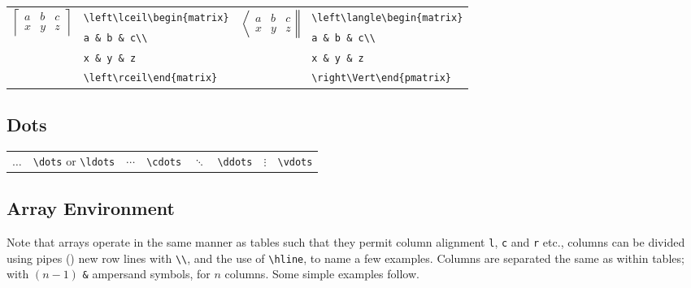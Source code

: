 \documentclass[10pt, english]{article}
\begin{document}
	\begin{center}
		\scriptsize
	\begin{tabular}{ll|ll}
		\multirow{4}{*}{$\left\lceil\begin{matrix}a&b&c\\x&y&z\end{matrix}\right\rceil$} & \verb|\left\lceil\begin{matrix}| & \multirow{4}{*}{$\left\langle\begin{matrix}a&b&c\\x&y&z\end{matrix}\right\Vert$} & \verb|\left\langle\begin{matrix}|\\
		& \verb|a & b & c\\| & & \verb|a & b & c\\|\\ 
		& \verb|x & y & z| & & \verb|x & y & z| \\
		& \verb|\left\rceil\end{matrix}| & & \verb|\right\Vert\end{pmatrix}|\\
	\end{tabular}
	\end{center}

	\subsection{Dots}

	\begin{center}
                \scriptsize
        \begin{tabular}{ll|ll|ll|ll}
                $\dots$ & \verb|\dots| or \verb|\ldots| & $\cdots$ & \verb|\cdots| & $\ddots$ & \verb|\ddots| & $\vdots$ & \verb|\vdots|\\
        \end{tabular}
        \end{center}

	\subsection{Array Environment}

	Note that arrays operate in the same manner as tables such that they permit column alignment \verb|l|, \verb|c| and \verb|r| etc., columns can be divided using pipes (\texttt{\textbar}) new row lines with \verb|\\|, and the use of \verb|\hline|, to name a few examples. Columns are separated the same as within tables; with $(n-1)$ \verb|&| ampersand symbols, for $n$ columns. Some simple examples follow.
\end{document}
